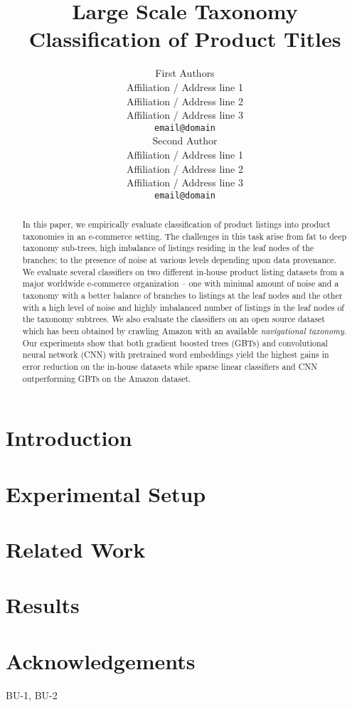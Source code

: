 \documentclass[11pt]{article}
\title{Large Scale Taxonomy Classification of Product Titles}
\author{First Authors \\
  Affiliation / Address line 1 \\
  Affiliation / Address line 2 \\
  Affiliation / Address line 3 \\
  {\tt email@domain} \\\And
  Second Author \\
  Affiliation / Address line 1 \\
  Affiliation / Address line 2 \\
  Affiliation / Address line 3 \\
  {\tt email@domain} \\}
\date{}
\begin{document}
\maketitle
\begin{abstract}
In this paper, we empirically evaluate classification of product listings into product taxonomies in an e-commerce setting.
The challenges in this task arise from fat to deep taxonomy sub-trees, high imbalance of listings residing in the leaf nodes of the branches; to the presence of noise at various levels depending upon data provenance.
We evaluate several classifiers on two different in-house product listing datasets from a major worldwide e-commerce organization -- 
one with minimal amount of noise and a taxonomy with a better balance of branches to listings at the leaf nodes and the other with a high level of noise and highly imbalanced number of listings in the leaf nodes of the taxonomy subtrees. 
We also evaluate the classifiers on an open source dataset which has been obtained by crawling Amazon with an available \textit{navigational taxonomy}. 
Our experiments show that both gradient boosted trees (GBTs) and convolutional neural network (CNN) with pretrained word embeddings yield the highest gains in error reduction on the in-house datasets while sparse linear classifiers and CNN outperforming GBTs on the Amazon dataset.

\end{abstract}

\section{Introduction}
\label{Sect:intro}

\section{Experimental Setup}
\label{Sect:experimental_setup}

\section{Related Work}
\label{Sect:related}

\section{Results}
\label{Sect:results}

\section{Acknowledgements}
\label{Sect:aknowledgement}

BU-1, BU-2



\end{document}
